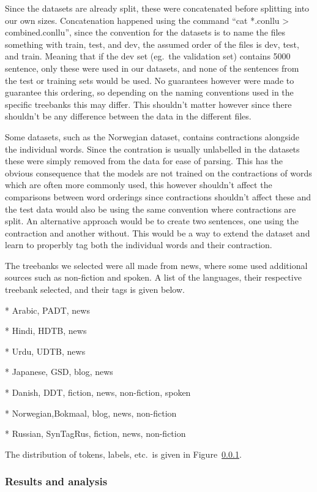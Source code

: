 Since the datasets are already split, these were concatenated before splitting
into our own sizes. Concatenation happened using the command ``cat *.conllu >
combined.conllu'', since the convention for the datasets is to name the files
something with train, test, and dev, the assumed order of the files is dev,
test, and train. Meaning that if the dev set (eg.\ the validation set) contains
5000 sentence, only these were used in our datasets, and none of the sentences
from the test or training sets would be used. No guarantees however were made to
guarantee this ordering, so depending on the naming conventions used in the
specific treebanks this may differ. This shouldn't matter however since there
shouldn't be any difference between the data in the different files.

Some datasets, such as the Norwegian dataset, contains contractions alongside
the individual words. Since the contration is usually unlabelled in the datasets
these were simply removed from the data for ease of parsing. This has the
obvious consequence that the models are not trained on the contractions of words
which are often more commonly used, this however shouldn't affect the
comparisons between word orderings since contractions shouldn't affect these and
the test data would also be using the same convention where contractions are
split. An alternative approach would be to create two sentences, one using the
contraction and another without. This would be a way to extend the dataset and
learn to properbly tag both the individual words and their contraction.

The treebanks we selected were all made from news, where some used additional
sources such as non-fiction and spoken. A list of the languages, their
respective treebank selected, and their tags is given below.

* Arabic,   PADT, news

* Hindi,    HDTB, news

* Urdu,     UDTB, news

* Japanese, GSD, blog, news

* Danish,   DDT, fiction, news, non-fiction, spoken

* Norwegian,Bokmaal, blog, news, non-fiction

* Russian,  SynTagRus, fiction, news, non-fiction

The distribution of tokens, labels, etc.\ is given in Figure~\ref{}.

\subsubsection{Results and analysis}

